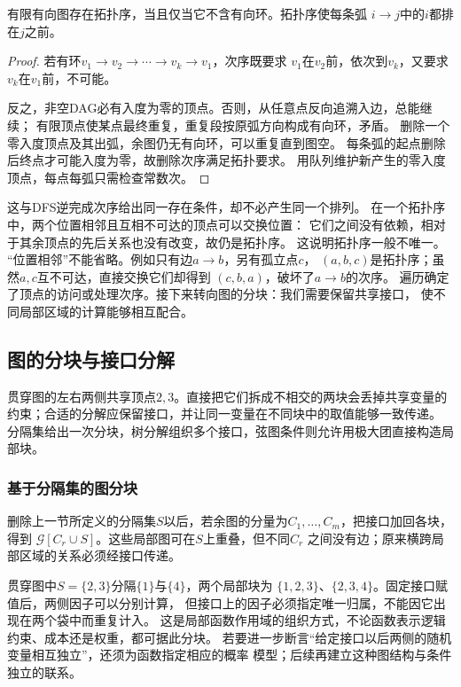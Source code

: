 \begin{theorem}[DAG的拓扑排序]
  \label{thm:graph-theory-topological-order}
  有限有向图存在拓扑序，当且仅当它不含有向环。拓扑序使每条弧
  \(i\to j\)中的\(i\)都排在\(j\)之前。
\end{theorem}

\begin{proof}
若有环\(v_1\to v_2\to\cdots\to v_k\to v_1\)，次序既要求
\(v_1\)在\(v_2\)前，依次到\(v_k\)，又要求\(v_k\)在\(v_1\)前，不可能。

反之，非空DAG必有入度为零的顶点。否则，从任意点反向追溯入边，总能继续；
有限顶点使某点最终重复，重复段按原弧方向构成有向环，矛盾。
删除一个零入度顶点及其出弧，余图仍无有向环，可以重复直到图空。
每条弧的起点删除后终点才可能入度为零，故删除次序满足拓扑要求。
用队列维护新产生的零入度顶点，每点每弧只需检查常数次。
\end{proof}

这与DFS逆完成次序给出同一存在条件，却不必产生同一个排列。
在一个拓扑序中，两个位置相邻且互相不可达的顶点可以交换位置：
它们之间没有依赖，相对于其余顶点的先后关系也没有改变，故仍是拓扑序。
这说明拓扑序一般不唯一。
“位置相邻”不能省略。例如只有边\(a\to b\)，另有孤立点\(c\)，
\((a,b,c)\)是拓扑序；虽然\(a,c\)互不可达，直接交换它们却得到
\((c,b,a)\)，破坏了\(a\to b\)的次序。
遍历确定了顶点的访问或处理次序。接下来转向图的分块：我们需要保留共享接口，
使不同局部区域的计算能够相互配合。

\subsection{图的分块与接口分解}

贯穿图的左右两侧共享顶点\(2,3\)。直接把它们拆成不相交的两块会丢掉共享变量的
约束；合适的分解应保留接口，并让同一变量在不同块中的取值能够一致传递。
分隔集给出一次分块，树分解组织多个接口，弦图条件则允许用极大团直接构造局部块。

\subsubsection{基于分隔集的图分块}
\label{sec:graph-theory-separators}

删除上一节所定义的分隔集\(S\)以后，若余图的分量为\(C_1,\ldots,C_m\)，把接口加回各块，得到
\(\mathcal G[C_r\cup S]\)。这些局部图可在\(S\)上重叠，但不同\(C_r\)
之间没有边；原来横跨局部区域的关系必须经接口传递。

贯穿图中\(S=\{2,3\}\)分隔\(\{1\}\)与\(\{4\}\)，两个局部块为
\(\{1,2,3\}\)、\(\{2,3,4\}\)。固定接口赋值后，两侧因子可以分别计算，
但接口上的因子必须指定唯一归属，不能因它出现在两个袋中而重复计入。
这是局部函数作用域的组织方式，不论函数表示逻辑约束、成本还是权重，都可据此分块。
若要进一步断言“给定接口以后两侧的随机变量相互独立”，还须为函数指定相应的概率
模型；后续再建立这种图结构与条件独立的联系。

